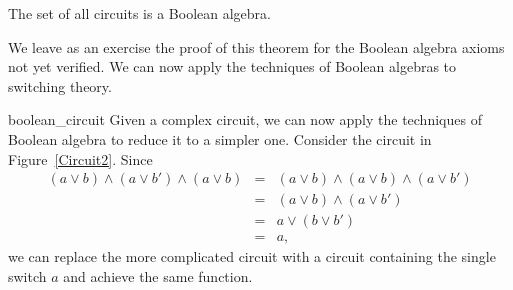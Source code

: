 \begin{theorem}
The set of all circuits is a Boolean algebra.
\end{theorem}
 
 
We leave as an exercise the proof of this theorem for the Boolean
algebra axioms not yet verified. We can now apply the techniques of
Boolean algebras to switching theory. 
 
 

\begin{example}{boolean_circuit}
Given a complex circuit, we can now apply the techniques of
Boolean algebra to reduce it to a simpler one. Consider the circuit in 
Figure~\ref{Circuit2}. Since 
\begin{eqnarray*}
(a \vee b) \wedge (a \vee b') \wedge (a \vee b)
& = &
(a \vee b) \wedge (a \vee b) \wedge (a \vee b') \\
& = &
(a \vee b) \wedge (a \vee b') \\
& = &
a \vee ( b \vee b') \\
& = &
a,
\end{eqnarray*}
we can replace the more complicated circuit with a circuit containing
the single switch $a$ and achieve the same function.
\end{example}
 
 
 

 
\histhead
 
